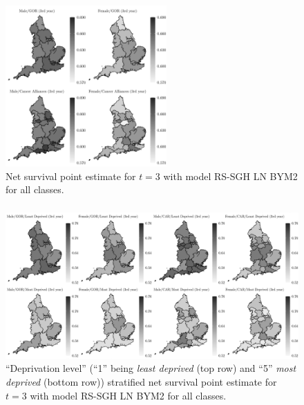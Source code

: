 \documentclass[10pt, aspectratio = 169, handout]{beamer} %
\begin{document}
    \begin{frame}[t]
		\frametitle{}
		\justifying

        \vspace{-6pt}
        \begin{figure}[!ht]
            \centering
            \includegraphics[width = 0.55\textwidth]{Images/cs01-t3-mean.jpg}
            \caption{Net survival point estimate for $t = 3$ with model RS-SGH LN BYM2 for all classes.}
            \label{fig:cs01-t3-mean}
        \end{figure}    

	\end{frame}

    \begin{frame}[t]
		\frametitle{}
		\justifying
        \vspace{-2pt}
        \begin{figure}[!ht]
            \centering
            \includegraphics[width = 1\textwidth]{Images/cs01-t3-mean-dep.jpg}
            \caption{``Deprivation level'' (``1'' being \textit{least deprived} (top row) and ``5'' \textit{most deprived} (bottom row)) stratified net survival point estimate for $t = 3$ with model RS-SGH LN BYM2 for all classes.}
            \label{fig:cs01-t3-mean-dep}
        \end{figure}  
	\end{frame}
\end{document}
